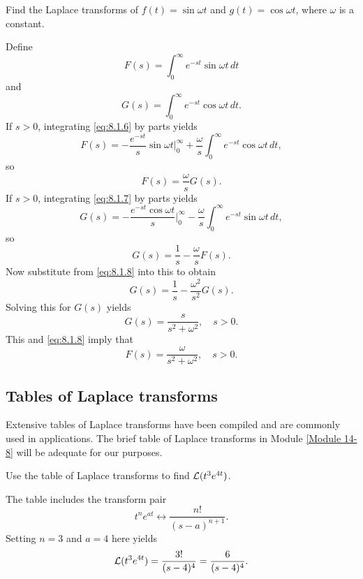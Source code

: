 \documentclass{ximera}
\begin{document}
\begin{example}\label{example:8.1.4} 
Find the Laplace transforms of $f(t)=\sin\omega t$ and
$g(t)=\cos\omega t$, where $\omega$ is a constant.

\begin{explanation}  
Define
\begin{equation}\label{eq:8.1.6}
F(s)=\int_0^\infty e^{-st}\sin\omega t\,dt
\end{equation}
and
\begin{equation}\label{eq:8.1.7}
G(s)=\int_0^\infty e^{-st}\cos\omega t\,dt.
\end{equation}
If $s>0$, integrating  \eqref{eq:8.1.6} by parts yields
$$
F(s)=-\frac{e^{-st}}{s}\sin\omega t\Big|_0^\infty+\frac{\omega}{s}
\int_0^\infty e^{-st}\cos\omega t\,dt,
$$
so
\begin{equation}\label{eq:8.1.8}
F(s)=\frac{\omega}{s}G(s).
\end{equation}
If $s>0$, integrating  \eqref{eq:8.1.7} by parts yields
$$
G(s)=-\frac{e^{-st}\cos\omega t}{s}\Big|_0^\infty - \frac{\omega}{s}
\int_0^\infty e^{-st}\sin\omega t\,dt,
$$
so
$$
G(s)=\frac{1}{s} - \frac{\omega}{s} F(s).
$$
Now substitute from  \eqref{eq:8.1.8} into this to obtain
$$
G(s)=\frac{1}{s} - \frac{\omega^2}{s^2} G(s).
$$
Solving this for $G(s)$ yields
$$
G(s)=\frac{s}{s^2+\omega^2},\quad s>0.
$$
This and  \eqref{eq:8.1.8} imply that
$$
F(s)=\frac{\omega}{s^2+\omega^2},\quad s>0.
$$
\end{explanation}
\end{example}
\subsection*{Tables of Laplace transforms}

Extensive tables of Laplace transforms have been compiled and are
commonly used in applications. The brief table of Laplace transforms
in Module \ref{Module 14-8}  %
will be adequate for our purposes.

\begin{example}\label{example:8.1.5}  Use the
table of Laplace transforms to find  ${\cal L}(t^3e^{4t})$.

\begin{explanation}
The table includes the transform pair
$$
t^ne^{at}\leftrightarrow \frac{n!}{(s-a)^{n+1}}.
$$
Setting $n=3$ and $a=4$ here yields
$$
{\cal L}(t^3e^{4t})=\frac{3!}{(s-4)^4}=\frac{6}{(s-4)^4}.
$$
\end{explanation}
\end{example}
\end{document}
